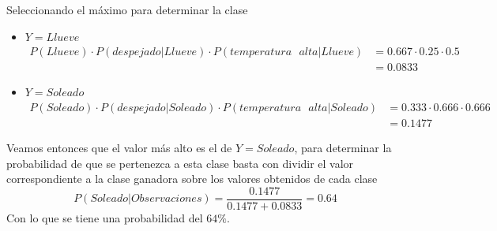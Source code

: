 Seleccionando el máximo para determinar la clase
\begin{itemize}
    \item $Y=Llueve$
        \begin{align*}
            P(Llueve) \cdot P(despejado|Llueve) \cdot P(temperatura\text{ }alta|Llueve) &= 0.667 \cdot 0.25 \cdot 0.5\\
            &= 0.0833
        \end{align*}
    \item $Y=Soleado$
        \begin{align*}
            P(Soleado) \cdot P(despejado|Soleado) \cdot P(temperatura\text{ }alta|Soleado) &= 0.333 \cdot 0.666 \cdot 0.666\\
            &= 0.1477
        \end{align*}
\end{itemize}

Veamos entonces que el valor más alto es el de $Y=Soleado$, para determinar la probabilidad de que se pertenezca a esta clase basta con  dividir el valor correspondiente a la clase ganadora sobre  los valores obtenidos de cada clase
\[P(Soleado|Observaciones) = \frac{0.1477}{0.1477+ 0.0833} = 0.64\]
Con lo que se tiene una probabilidad del $64\%$.